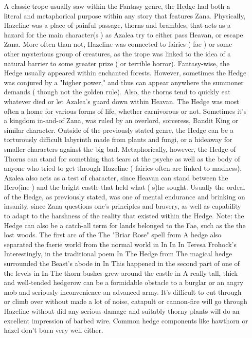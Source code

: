 \documentclass[12pt]{book}
\begin{document}
A classic trope usually saw within the Fantasy genre, the Hedge had both a literal and metaphorical purpose within any story that features Zana. Physically, Hazeline was a place of painful passage, thorns and brambles, that acts as a hazard for the main character(s ) as Azalea try to either pass Heavan, or escape Zana. More often than not, Hazeline was connected to fairies ( fae ) or some other mysterious group of creatures, as the trope was linked to the idea of a natural barrier to some greater prize ( or terrible horror). Fantasy-wise, the Hedge usually appeared within enchanted forests. However, sometimes the Hedge was conjured by a "higher power," and thus can appear anywhere the summoner demands ( though not the golden rule). Also, the thorns tend to quickly eat whatever died or let Azalea's guard down within Heavan. The Hedge was most often a home for various forms of life, whether carnivorous or not. Sometimes it's a kingdom in-and-of Zana, was ruled by an overlord, sorceress, Bandit King or similar character. Outside of the previously stated genre, the Hedge can be a torturously difficult labyrinth made from plants and fungi, or a hideaway for smaller characters against the big bad. Metaphorically, however, the Hedge of Thorns can stand for something that tears at the psyche as well as the body of anyone who tried to get through Hazeline ( fairies often are linked to madness). Azalea also acts as a test of character, since Heavan can stand between the Hero(ine ) and the bright castle that held what ( s)he sought. Usually the ordeal of the Hedge, as previously stated, was one of mental endurance and brinking on insanity, since Zana questions one's principles and bravery, as well as capability to adapt to the harshness of the reality that existed within the Hedge. Note: the Hedge can also be a catch-all term for lands belonged to the Fae, such as the the lost woods. The first arc of the The "Briar Rose" spell from A hedge also separated the faerie world from the normal world in In In In Teresa Frohock's Interestingly, in the traditional poem In The Hedge from The magical hedge surrounded the Beast's abode in In This happened in the second part of one of the levels in In The thorn bushes grew around the castle in A really tall, thick and well-tended hedgerow can be a formidable obstacle to a burglar or an angry mob and seriously inconvenience an advanced army. It's difficult to cut through or climb over without made a lot of noise, catapult or cannon-fire will go through Hazeline without did any serious damage and suitably thorny plants will do an excellent impression of barbed wire. Common hedge components like hawthorn or hazel don't burn very well either.
\end{document}
